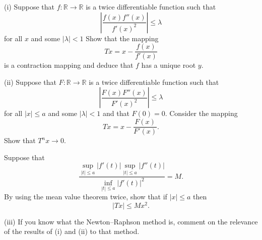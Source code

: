 \begin{question} (i) Suppose that $f:{\mathbb R}\rightarrow{\mathbb R}$
is a twice differentiable function such that
\[\left|\frac{f(x)f''(x)}{f'(x)^{2}}\right|
\leq\lambda\]
for all $x$ and some $|\lambda|<1$
Show that the mapping
\[Tx=x-\frac{f(x)}{f'(x)}\]
is a contraction mapping and deduce that $f$ has
a unique root $y$.

(ii) Suppose that $F:{\mathbb R}\rightarrow{\mathbb R}$
is a twice differentiable function such that
\[\left|\frac{F(x)F''(x)}{F'(x)^{2}}\right|
\leq\lambda\]
for all $|x|\leq a$ and some $|\lambda|<1$
and that $F(0)=0$. 
Consider the mapping
\[Tx=x-\frac{F(x)}{F'(x)}.\]
Show that $T^{n}x\rightarrow 0$.

Suppose that
\[\frac{\sup_{|t|\leq a}|f'(t)|\sup_{|t|\leq a}|f''(t)|}
{\inf_{|t|\leq a}|f'(t)|^{2}}=M.\]
By using the mean value theorem twice,
show that if $|x|\leq a$ then
\[|Tx|\leq Mx^{2}.\]

(iii) If you know what the Newton--Raphson method is,
comment on the relevance of the results of (i) and (ii)
to that method.


\end{question}
